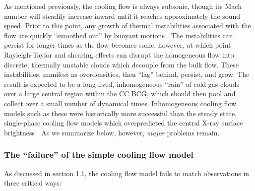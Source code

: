 As mentioned previously, the cooling flow is always subsonic, though its Mach number will steadily increase inward until 
it reaches approximately the sound speed. Prior to this point, any growth of thermal instabilities 
associated with the flow are quickly ``smoothed out'' by buoyant motions \citep{balbus89}. 
The instabilities can persist for longer times as the flow becomes sonic, however, at which point 
Rayleigh-Taylor and shearing effects can disrupt the homogeneous flow into discrete, thermally unstable clouds
which decouple from the bulk flow. These instabilities, manifest as overdensities, then ``lag'' behind, persist, and grow. 
The result is expected to be a long-lived, inhomogeneous ``rain'' of cold gas clouds over a large central region within the CC BCG, which should 
then pool and collect over a small number of dynamical times.
Inhomogeneous cooling flow models such as these were historically more successful than the steady state, single-phase 
cooling flow models which overpredicted the central X-ray surface brightness \citep{nulsen86}.
As we summarize below, however, {\it major} problems remain.  



 









\subsubsection{{\bf The ``failure'' of the simple cooling flow model}}


As discussed in section 1.1, the cooling flow model fails to match observations in three critical ways: 


